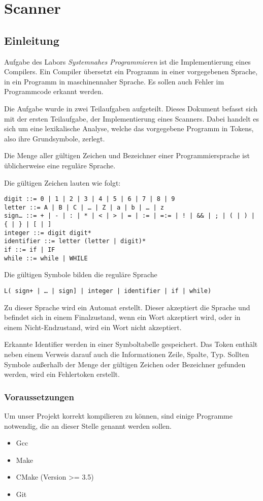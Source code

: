 \chapter{Scanner}\label{chap:intro}

\section{Einleitung}
Aufgabe des Labors \textit{Systemnahes Programmieren} ist die Implementierung eines Compilers. Ein Compiler übersetzt ein Programm in einer vorgegebenen Sprache, in ein Programm in maschinennaher Sprache. Es sollen auch Fehler im Programmcode erkannt werden.

Die Aufgabe wurde in zwei Teilaufgaben aufgeteilt. Dieses Dokument befasst sich mit der ersten Teilaufgabe, der Implementierung eines Scanners.
Dabei handelt es sich um eine lexikalische Analyse, welche das vorgegebene Programm in Tokens, also ihre Grundsymbole, zerlegt.

Die Menge aller gültigen Zeichen und Bezeichner einer Programmiersprache ist üblicherweise eine reguläre Sprache.

Die gültigen Zeichen lauten wie folgt:
\begin{verbatim}
digit ::= 0 | 1 | 2 | 3 | 4 | 5 | 6 | 7 | 8 | 9
letter ::= A | B | C | … | Z | a | b | … | z
sign… ::= + | - | : | * | < | > | = | := | =:= | ! | && | ; | ( | ) | { | } | [ | ]
integer ::= digit digit*
identifier ::= letter (letter | digit)*
if ::= if | IF
while ::= while | WHILE
\end{verbatim}

Die gültigen Symbole bilden die reguläre Sprache
\begin{verbatim}
L( sign+ | … | sign] | integer | identifier | if | while)
\end{verbatim}

Zu dieser Sprache wird ein Automat erstellt. Dieser akzeptiert die Sprache und befindet sich in einem Finalzustand, wenn ein Wort akzeptiert wird, oder in einem Nicht-Endzustand, wird ein Wort nicht akzeptiert.

Erkannte Identifier werden in einer Symboltabelle gespeichert. Das Token enthält neben einem Verweis darauf auch die Informationen Zeile, Spalte, Typ. Sollten Symbole außerhalb der Menge der gültigen Zeichen oder Bezeichner gefunden werden, wird ein Fehlertoken erstellt.


\subsection{Voraussetzungen}
Um unser Projekt korrekt kompilieren zu können, sind einige Programme notwendig, die an dieser Stelle genannt werden sollen.
\begin{itemize}
  \item Gcc
  \item Make
  \item CMake (Version >= \textsc{3.5})
  \item Git
\end{itemize}

